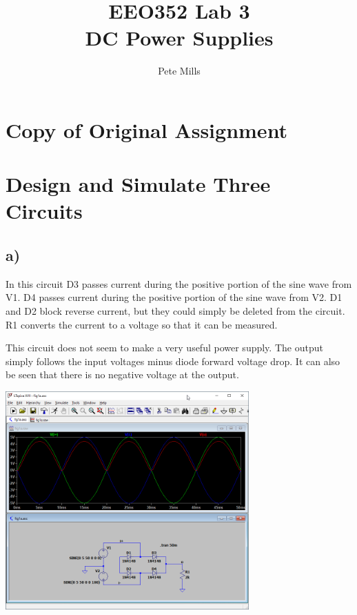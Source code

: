 \documentclass{article}
\begin{document}
	
	
	\title{EEO352 Lab 3\\DC Power Supplies}
	\author{Pete Mills}
	
	\maketitle
	
	\section*{Copy of Original Assignment}
	
	
	
	\section{Design and Simulate Three Circuits}
	
	\subsection*{a)}
	
	In this circuit D3 passes current during the positive portion of the sine wave from V1. D4 passes current during the positive portion of the sine wave from V2. D1 and D2 block reverse current, but they could simply be deleted from the circuit. R1 converts the current to a voltage so that it can be measured.
	
	This circuit does not seem to make a very useful power supply. The output simply follows the input voltages  minus diode forward voltage drop. It can also be seen that there is no negative voltage at the output. 

	\begin{center}
	\includegraphics[width=0.7\textwidth]{fig1a}
	\end{center}
\end{document}
